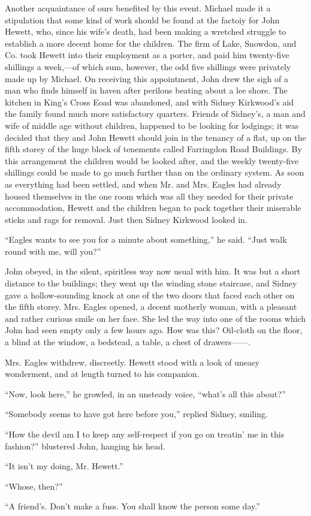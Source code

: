 Another acquaintance of ours benefited by this event. Michael made it a
stipulation that some kind of work should be found at the factoiy for
John Hewett, who, since his wife's death, had been making a wretched
struggle to establish a more decent home for the children. The firm of
Lake, Snowdon, and Co. took Hewett into their employment as a porter,
and paid him twenty-five shillings a week,---of which sum, however, the
odd five shillings were privately made up by Michael. On receiving this
appointment, John drew the sigh of a man who finds himself in haven
after perilous beating about a lee shore. The kitchen in King's Cross
Eoad was abandoned, and with Sidney Kirkwood's aid the family
{\protect\hypertarget{193}{}{}}found much more satisfactory quarters.
Friends of Sidney's, a man and wife of middle age without children,
happened to be looking for lodgings; it was decided that they and John
Hewett should join in the tenancy of a flat, up on the fifth storey of
the huge block of tenements called Farringdon Road Buildings. By this
arrangement the children would be looked after, and the weekly
twenty-five shillings could be made to go much further than on the
ordinary system. As soon as everything had been settled, and when Mr.
and Mrs. Eagles had already housed themselves in the one room which was
all they needed for their private accommodation, Hewett and the children
began to pack together their miserable sticks and rags for removal. Just
then Sidney Kirkwood looked in.

``Eagles wants to see you for a minute about something,'' he said.
``Just walk round with me, will you?''

John obeyed, in the silent, spiritless way now usual with him. It was
but a short distance to the buildings; they went up the
{\protect\hypertarget{194}{}{}}winding stone staircase, and Sidney gave
a hollow-sounding knock at one of the two doors that faced each other on
the fifth storey. Mrs. Eagles opened, a decent motherly woman, with a
pleasant and rather curious smile on her face. She led the way into one
of the rooms which John had seen empty only a few hours ago. How was
this? Oil-cloth on the floor, a blind at the window, a bedstead, a
table, a chest of {drawers{{------}}.}

Mrs. Eagles withdrew, discreetly. Hewett stood with a look of uneasy
wonderment, and at length turned to his companion.

``Now, look here,'' he growled, in an unsteady voice, ``what's all this
about?''

``Somebody seems to have got here before you,'' replied Sidney, smiling.

``How the devil am I to keep any self-respect if you go on treatin' me
in this fashion?'' blustered John, hanging his head.

``It isn't my doing, Mr. Hewett.''

``Whose, then?''

``A friend's. Don't make a fuss. You shall know the person some day.''
